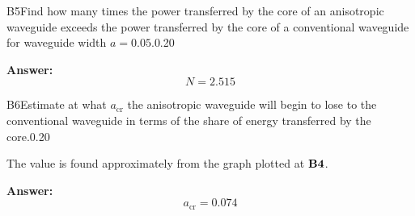 \documentclass[11pt,a4paper]{article}
\begin{document}
\begin{solcard}{B5}{Find how many times the power transferred by the core of an anisotropic waveguide exceeds the power transferred by the core of a conventional waveguide for waveguide width $a=0.05$.}{0.20}
\par\smallskip\noindent\textbf{Answer:} \[N=2.515\]
\end{solcard}

\begin{solcard}{B6}{Estimate at what $a_{\mathrm{cr}}$ the anisotropic waveguide will begin to lose to the conventional waveguide in terms of the share of energy transferred by the core.}{0.20}

The value is found approximately from the graph plotted at $\bf B4$.

\par\smallskip\noindent\textbf{Answer:} \[a_{\mathrm{cr}}=0.074\]
\end{solcard}
\end{document}
